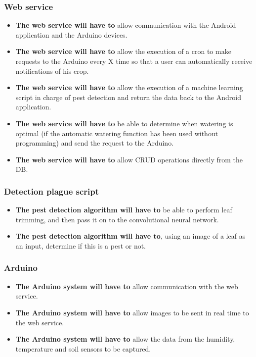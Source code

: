 \documentclass[11pt,a4paper]{article}
\begin{document}
\subsubsection{Web service}
\begin{itemize}
\item \textbf{The web service will have to} allow communication with the Android application and the Arduino devices.

\item \textbf{The web service will have to} allow the execution of a cron to make requests to the Arduino every X time so that a user can automatically receive notifications of his crop.

\item \textbf{The web service will have to} allow the execution of a machine learning script in charge of pest detection and return the data back to the Android application.

\item \textbf{The web service will have to} be able to determine when watering is optimal (if the automatic watering function has been used without programming) and send the request to the Arduino.

\item \textbf{The web service will have to} allow CRUD operations directly from the DB.
\end{itemize}

\subsubsection{Detection plague script}
\begin{itemize}
\item \textbf{The pest detection algorithm will have to} be able to perform leaf trimming, and then pass it on to the convolutional neural network.

\item \textbf{The pest detection algorithm will have to}, using an image of a leaf as an input, determine if this is a pest or not.
\end{itemize}

\subsubsection{Arduino}
\begin{itemize}
\item \textbf{The Arduino system will have to} allow communication with the web service.

\item \textbf{The Arduino system will have to} allow images to be sent in real time to the web service.

\item \textbf{The Arduino system will have to} allow the data from the humidity, temperature and soil sensors to be captured.

\end{itemize}
\end{document}
